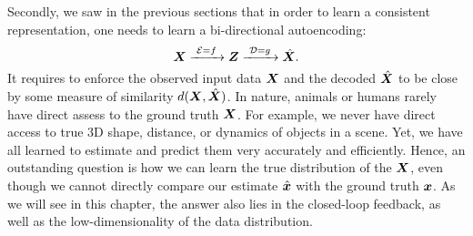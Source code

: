 \documentclass[\toplevelprefix/book-main.tex]{subfiles}
\begin{document}
Secondly, we saw in the previous sections that in order to learn a consistent representation, one needs to learn a bi-directional autoencoding:
\begin{equation}
 \bm{X}
\xrightarrow{\hspace{1mm} \mathcal{E} = f \hspace{1mm}} \bm{Z}  \xrightarrow{\hspace{1mm} \mathcal{D} = g \hspace{1mm}} \hat{\bm{X}}.
\end{equation}
It requires to enforce the observed input data $\bm{X}$ and the decoded $\hat {\bm{X}}$ to be close by some measure of similarity $d(\bm{X}, \hat {\bm{X}})$. In nature, animals or humans rarely have direct assess to the ground truth $\bm{X}$. For example, we never have direct access to true 3D shape, distance, or dynamics of objects in a scene. Yet, we have all learned to estimate and predict them very accurately and efficiently. Hence, an outstanding question is how we can learn the true distribution of the $\bm{X}$, even though we cannot directly compare our estimate $\hat {\bm{x}}$ with the ground truth $\bm{x}$. As we will see in this chapter, the answer also  lies in the closed-loop feedback, as well as the low-dimensionality of the data distribution. 




\end{document}
